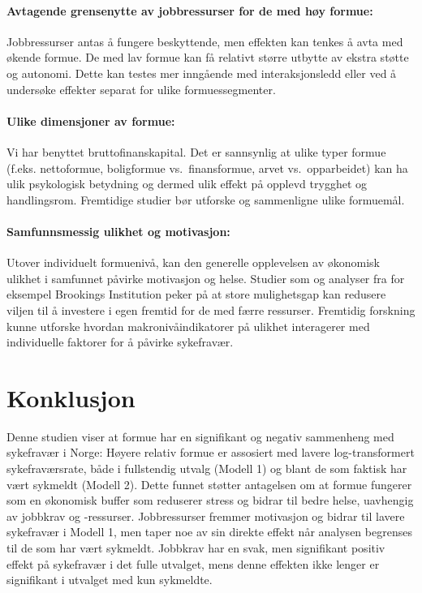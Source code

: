 \documentclass[
  12pt,
  a4paper,
  DIV=11,
  numbers=noendperiod]{scrartcl}
\let\oldparagraph\paragraph
\renewcommand{\paragraph}[1]{\oldparagraph{#1}\mbox{}}
\begin{document}
\paragraph{Avtagende grensenytte av jobbressurser for de med høy
formue:}\label{avtagende-grensenytte-av-jobbressurser-for-de-med-huxf8y-formue}

Jobbressurser antas å fungere beskyttende, men effekten kan tenkes å
avta med økende formue. De med lav formue kan få relativt større utbytte
av ekstra støtte og autonomi. Dette kan testes mer inngående med
interaksjonsledd eller ved å undersøke effekter separat for ulike
formuessegmenter.

\paragraph{Ulike dimensjoner av
formue:}\label{ulike-dimensjoner-av-formue}

Vi har benyttet bruttofinanskapital. Det er sannsynlig at ulike typer
formue (f.eks. nettoformue, boligformue vs.~finansformue, arvet
vs.~opparbeidet) kan ha ulik psykologisk betydning og dermed ulik effekt
på opplevd trygghet og handlingsrom. Fremtidige studier bør utforske og
sammenligne ulike formuemål.

\paragraph{Samfunnsmessig ulikhet og
motivasjon:}\label{samfunnsmessig-ulikhet-og-motivasjon}

Utover individuelt formuenivå, kan den generelle opplevelsen av
økonomisk ulikhet i samfunnet påvirke motivasjon og helse. Studier som
\href{https://pmc.ncbi.nlm.nih.gov/articles/PMC7473543}{} og analyser
fra for eksempel Brookings Institution
\href{https://www.brookings.edu/articles/income-inequality-social-mobility-and-the-decision-to-drop-out-of-high-school/}{}
peker på at store mulighetsgap kan redusere viljen til å investere i
egen fremtid for de med færre ressurser. Fremtidig forskning kunne
utforske hvordan makronivåindikatorer på ulikhet interagerer med
individuelle faktorer for å påvirke sykefravær.

\newpage

\section{Konklusjon}\label{konklusjon}

Denne studien viser at formue har en signifikant og negativ sammenheng
med sykefravær i Norge: Høyere relativ formue er assosiert med lavere
log-transformert sykefraværsrate, både i fullstendig utvalg (Modell 1)
og blant de som faktisk har vært sykmeldt (Modell 2). Dette funnet
støtter antagelsen om at formue fungerer som en økonomisk buffer som
reduserer stress og bidrar til bedre helse, uavhengig av jobbkrav og
-ressurser. Jobbressurser fremmer motivasjon og bidrar til lavere
sykefravær i Modell 1, men taper noe av sin direkte effekt når analysen
begrenses til de som har vært sykmeldt. Jobbkrav har en svak, men
signifikant positiv effekt på sykefravær i det fulle utvalget, mens
denne effekten ikke lenger er signifikant i utvalget med kun sykmeldte.
\end{document}
